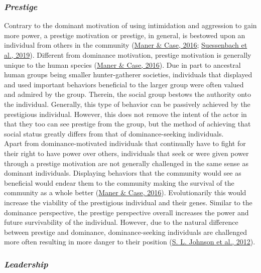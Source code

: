 \documentclass[
  donotrepeattitle,doc, 12pt, a4paper,floatsintext]{apa7}
\begin{document}
\hypertarget{prestige}{%
\subsubsection{\texorpdfstring{\emph{Prestige}}{Prestige}}\label{prestige}}

Contrary to the dominant motivation of using intimidation and aggression to gain more power, a prestige motivation or prestige, in general, is bestowed upon an individual from others in the community (\protect\hyperlink{ref-maner2016}{Maner \& Case, 2016}; \protect\hyperlink{ref-suessenbach2019}{Suessenbach et al., 2019}). Different from dominance motivation, prestige motivation is generally unique to the human species (\protect\hyperlink{ref-maner2016}{Maner \& Case, 2016}). Due in part to ancestral human groups being smaller hunter-gatherer societies, individuals that displayed and used important behaviors beneficial to the larger group were often valued and admired by the group. Therein, the social group bestows the authority onto the individual. Generally, this type of behavior can be passively achieved by the prestigious individual. However, this does not remove the intent of the actor in that they too can see prestige from the group, but the method of achieving that social status greatly differs from that of dominance-seeking individuals.\\

Apart from dominance-motivated individuals that continually have to fight for their right to have power over others, individuals that seek or were given power through a prestige motivation are not generally challenged in the same sense as dominant individuals. Displaying behaviors that the community would see as beneficial would endear them to the community making the survival of the community as a whole better (\protect\hyperlink{ref-maner2016}{Maner \& Case, 2016}). Evolutionarily this would increase the viability of the prestigious individual and their genes. Similar to the dominance perspective, the prestige perspective overall increases the power and future survivability of the individual. However, due to the natural difference between prestige and dominance, dominance-seeking individuals are challenged more often resulting in more danger to their position (\protect\hyperlink{ref-johnson2012}{S. L. Johnson et al., 2012}).

\hypertarget{leadership}{%
\subsubsection{\texorpdfstring{\emph{Leadership}}{Leadership}}\label{leadership}}
\end{document}
